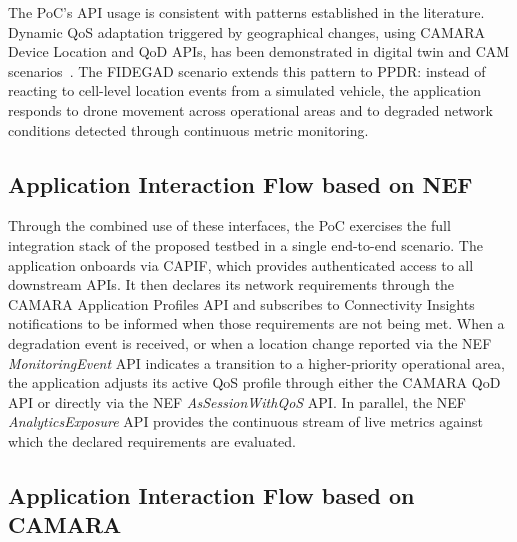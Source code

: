The \acs{PoC}'s \acs{API} usage is consistent with patterns established in the literature. Dynamic \acs{QoS} adaptation triggered by geographical changes, using CAMARA Device Location and \acs{QoD} \acsp{API}, has been demonstrated in digital twin and \acs{CAM} scenarios~\cite{DynamicQoSAdaptationviaExposedServiceAPIs, OnDemandNetworkQoSAdaptation}. The FIDEGAD scenario extends this pattern to \acs{PPDR}: instead of reacting to cell-level location events from a simulated vehicle, the application responds to drone movement across operational areas and to degraded network conditions detected through continuous metric monitoring.

\subsection{Application Interaction Flow based on \acs{NEF}}

Through the combined use of these interfaces, the \acs{PoC} exercises the full integration stack of the proposed testbed in a single end-to-end scenario. The application onboards via \acs{CAPIF}, which provides authenticated access to all downstream \acsp{API}. It then declares its network requirements through the CAMARA Application Profiles \acs{API} and subscribes to Connectivity Insights notifications to be informed when those requirements are not being met. When a degradation event is received, or when a location change reported via the \acs{NEF} \textit{MonitoringEvent} \acs{API} indicates a transition to a higher-priority operational area, the application adjusts its active \acs{QoS} profile through either the CAMARA \acs{QoD} \acs{API} or directly via the \acs{NEF} \textit{AsSessionWithQoS} \acs{API}. In parallel, the \acs{NEF} \textit{AnalyticsExposure} \acs{API} provides the continuous stream of live metrics against which the declared requirements are evaluated.


\subsection{Application Interaction Flow based on CAMARA}

